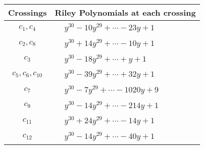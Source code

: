 \documentclass[1p]{elsarticle_modified}
\theoremstyle{definition}
\begin{document}
\begin{tabular}{m{50pt}|m{274pt}}
Crossings & \hspace{64pt}Riley Polynomials at each crossing \\
\hline $$\begin{aligned}c_{1},c_{4}\end{aligned}$$&$\begin{aligned}
&y^{30}-10 y^{29}+\cdots-23 y+1
\end{aligned}$\\
\hline $$\begin{aligned}c_{2},c_{8}\end{aligned}$$&$\begin{aligned}
&y^{30}+14 y^{29}+\cdots-10 y+1
\end{aligned}$\\
\hline $$\begin{aligned}c_{3}\end{aligned}$$&$\begin{aligned}
&y^{30}-18 y^{29}+\cdots+y+1
\end{aligned}$\\
\hline $$\begin{aligned}c_{5},c_{6},c_{10}\end{aligned}$$&$\begin{aligned}
&y^{30}-39 y^{29}+\cdots+32 y+1
\end{aligned}$\\
\hline $$\begin{aligned}c_{7}\end{aligned}$$&$\begin{aligned}
&y^{30}-7 y^{29}+\cdots-1020 y+9
\end{aligned}$\\
\hline $$\begin{aligned}c_{9}\end{aligned}$$&$\begin{aligned}
&y^{30}-14 y^{29}+\cdots-214 y+1
\end{aligned}$\\
\hline $$\begin{aligned}c_{11}\end{aligned}$$&$\begin{aligned}
&y^{30}+24 y^{29}+\cdots-14 y+1
\end{aligned}$\\
\hline $$\begin{aligned}c_{12}\end{aligned}$$&$\begin{aligned}
&y^{30}-14 y^{29}+\cdots-40 y+1
\end{aligned}$\\
\hline
\end{tabular}\\~\\
\end{document}
